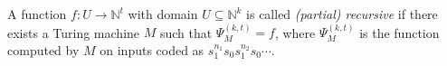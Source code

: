 A function $f: U \to \mathbb{N}^t$ with domain $U \subseteq \mathbb{N}^k$ is called \emph{(partial) recursive} if there exists a Turing machine $M$ such that $\Psi_M^{(k, t)} = f$, where $\Psi_M^{(k,t)}$ is the function computed by $M$ on inputs coded as $s_1^{n_1}s_0 s_1^{n_2}s_0 \cdots$.
